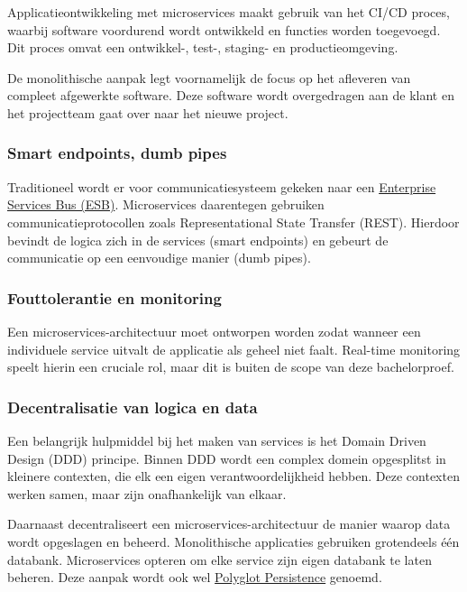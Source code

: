 Applicatieontwikkeling met microservices maakt gebruik van het CI/CD proces, waarbij software voordurend wordt ontwikkeld en functies worden toegevoegd. Dit proces omvat een ontwikkel-, test-, staging- en productieomgeving.

De monolithische aanpak legt voornamelijk de focus op het afleveren van compleet afgewerkte software. Deze software wordt overgedragen aan de klant en het projectteam gaat over naar het nieuwe project.

\subsubsection{Smart endpoints, dumb pipes}

Traditioneel wordt er voor communicatiesysteem gekeken naar een \hyperref[sec:ESB]{Enterprise Services Bus (ESB)}. Microservices daarentegen gebruiken communicatieprotocollen zoals Representational State Transfer (REST). Hierdoor bevindt de logica zich in de services (smart endpoints) en gebeurt de communicatie op een eenvoudige manier (dumb pipes).

\subsubsection{Fouttolerantie en monitoring}

Een microservices-architectuur moet ontworpen worden zodat wanneer een individuele service uitvalt de applicatie als geheel niet faalt. Real-time monitoring speelt hierin een cruciale rol, maar dit is buiten de scope van deze bachelorproef.

\subsubsection{Decentralisatie van logica en data}

Een belangrijk hulpmiddel bij het maken van services is het Domain Driven Design (DDD) principe. Binnen DDD wordt een complex domein opgesplitst in kleinere contexten, die elk een eigen verantwoordelijkheid hebben. Deze contexten werken samen, maar zijn onafhankelijk van elkaar.

Daarnaast decentraliseert een microservices-architectuur de manier waarop data wordt opgeslagen en beheerd. Monolithische applicaties gebruiken grotendeels één databank. Microservices opteren om elke service zijn eigen databank te laten beheren. Deze aanpak wordt ook wel \hyperref[sec:Polyglot Persistence]{Polyglot Persistence} genoemd.

